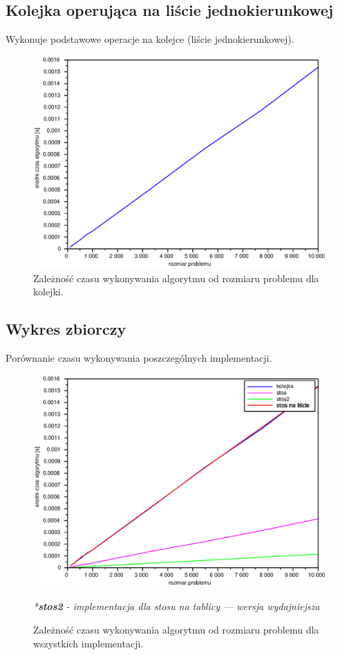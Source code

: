 \documentclass{mwart}
\begin{document}
\newpage
\subsection {Kolejka operująca na liście jednokierunkowej}
Wykonuje podstawowe operacje na kolejce (liście jednokierunkowej).

\begin{figure}[!htp]
\centering
\includegraphics[width=\textwidth]{files/queue.eps}
\caption{Zależność czasu wykonywania algorytmu od rozmiaru problemu dla kolejki. \label{queue}} 
\end{figure}

\newpage
\subsection {Wykres zbiorczy}
Porównanie czasu wykonywania poszczególnych implementacji.

\begin{figure}[!htp]
\centering
\includegraphics[width=\textwidth]{files/all.eps}
\caption{Zależność czasu wykonywania algorytmu od rozmiaru problemu dla wszystkich implementacji. \label{all}} 
\textit{*\textbf{stos2} - implementacja dla stosu na tablicy --- wersja wydajniejsza}
\end{figure}
\end{document}
